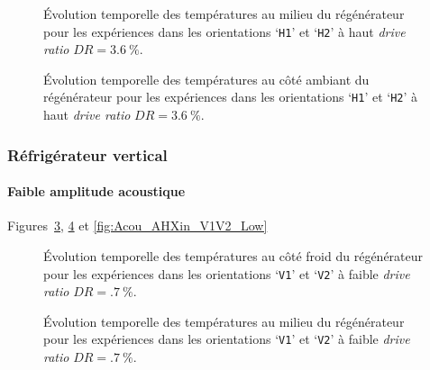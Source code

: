 \begin{figure}[!ht]
    \centering
    
    \caption{\'Evolution temporelle des températures au milieu du régénérateur pour les expériences dans les orientations `\texttt{H1}' et `\texttt{H2}' à haut \textit{drive ratio} $DR=\qty{3.6}{\percent}$.}
    \label{fig:Acou_Regmid_H1H2_High}
\end{figure}

\begin{figure}[!ht]
    \centering
    
    \caption{\'Evolution temporelle des températures au côté ambiant du régénérateur pour les expériences dans les orientations `\texttt{H1}' et `\texttt{H2}' à haut \textit{drive ratio} $DR=\qty{3.6}{\percent}$.}
    \label{fig:Acou_AHXin_H1H2_High}
\end{figure}

\subsubsection{Réfrigérateur vertical}
\paragraph{Faible amplitude acoustique} Figures~\ref{fig:Acou_CHXin_V1V2_Low}, \ref{fig:Acou_Regmid_V1V2_Low} et \ref{fig:Acou_AHXin_V1V2_Low}
\begin{figure}[!ht] %
    \centering
    
    \caption{\'Evolution temporelle des températures au côté froid du régénérateur pour les expériences dans les orientations `\texttt{V1}' et `\texttt{V2}' à faible \textit{drive ratio} $DR=\qty{.7}{\percent}$.}
    \label{fig:Acou_CHXin_V1V2_Low}
\end{figure}

\begin{figure}[!ht] %
    \centering
    
    \caption{\'Evolution temporelle des températures au milieu du régénérateur pour les expériences dans les orientations `\texttt{V1}' et `\texttt{V2}' à faible \textit{drive ratio} $DR=\qty{.7}{\percent}$.}
    \label{fig:Acou_Regmid_V1V2_Low}
\end{figure}

